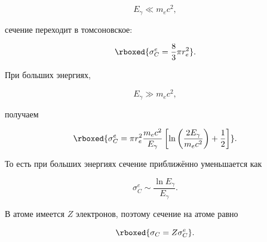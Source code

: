 \documentclass[../final.tex]{subfiles}
\begin{document}
\begin{equation*}
    E_\gamma
    \ll
    m_ec^2,
\end{equation*}

сечение переходит в томсоновское:

\begin{equation*}
    \rboxed{
        \sigma_C^e
        =
        \frac{8}{3}
        \pi r_e^2
    }.
\end{equation*}

При больших энергиях,

\begin{equation*}
    E_\gamma
    \gg
    m_ec^2,
\end{equation*}

получаем

\begin{equation*}
    \rboxed{
        \sigma_C^e
        =
        \pi r_e^2
        \frac{
            m_ec^2
        }{
            E_\gamma
        }
        \left[
            \ln
            \left(
                \frac{
                    2E_\gamma
                }{
                    m_ec^2
                }
            \right)
            +
            \frac12
        \right]
    }.
\end{equation*}

То есть при больших энергиях сечение
приближённо уменьшается как

\begin{equation*}
    \sigma_C^e
    \sim
    \frac{
        \ln E_\gamma
    }{
        E_\gamma
    }.
\end{equation*}

В атоме имеется $Z$ электронов,
поэтому сечение на атоме равно

\begin{equation*}
    \rboxed{
        \sigma_C
        =
        Z\sigma_C^e
    }.
\end{equation*}


\end{document}
